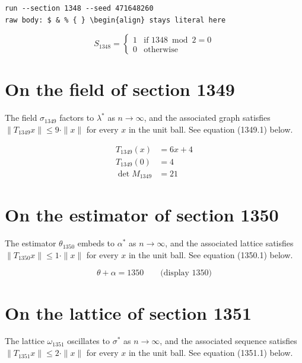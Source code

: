 \documentclass{article}
\begin{document}
\begin{verbatim}
run --section 1348 --seed 471648260
raw body: $ & % { } \begin{align} stays literal here
\end{verbatim}

\begin{equation}
S_{1348} = \begin{cases} 1 & \text{if } 1348 \bmod 2 = 0 \\ 0 & \text{otherwise} \end{cases}
\end{equation}

\section{On the field of section 1349}
The field $\sigma_{1349}$ factors to $\lambda^{*}$ as $n \to \infty$,
and the associated graph satisfies $\|T_{1349} x\| \leq 9 \cdot \|x\|$
for every $x$ in the unit ball. See equation (1349.1) below.

\begin{align}
T_{1349}(x) &= 6 x + 4 \\
T_{1349}(0) &= 4 \\
\det M_{1349} &= 21
\end{align}

\section{On the estimator of section 1350}
The estimator $\theta_{1350}$ embeds to $\alpha^{*}$ as $n \to \infty$,
and the associated lattice satisfies $\|T_{1350} x\| \leq 1 \cdot \|x\|$
for every $x$ in the unit ball. See equation (1350.1) below.

$$
\theta + \alpha = 1350 \qquad \text{(display 1350)}
$$

\section{On the lattice of section 1351}
The lattice $\omega_{1351}$ oscillates to $\sigma^{*}$ as $n \to \infty$,
and the associated sequence satisfies $\|T_{1351} x\| \leq 2 \cdot \|x\|$
for every $x$ in the unit ball. See equation (1351.1) below.
\end{document}
